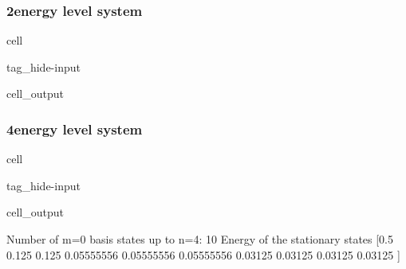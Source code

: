 \documentclass[letterpaper,10pt,english]{jupyterBook}
\begin{document}
\subsubsection{2\sphinxhyphen{}energy level system}
\label{\detokenize{ch/quantum-mechanics/history/matrix-mechanics/electron-perturbation-numerical:energy-level-system}}\label{\detokenize{ch/quantum-mechanics/history/matrix-mechanics/electron-perturbation-numerical:quantum-mechanics-electron-perturbation-numerical-simulation-2-energy-level}}
\begin{sphinxuseclass}{cell}
\begin{sphinxuseclass}{tag_hide-input}\begin{sphinxVerbatimOutput}

\begin{sphinxuseclass}{cell_output}
\noindent{}

\end{sphinxuseclass}\end{sphinxVerbatimOutput}

\end{sphinxuseclass}
\end{sphinxuseclass}

\subsubsection{4\sphinxhyphen{}energy level system}
\label{\detokenize{ch/quantum-mechanics/history/matrix-mechanics/electron-perturbation-numerical:quantum-mechanics-electron-perturbation-numerical-simulation-4-energy-level}}\label{\detokenize{ch/quantum-mechanics/history/matrix-mechanics/electron-perturbation-numerical:id1}}
\begin{sphinxuseclass}{cell}
\begin{sphinxuseclass}{tag_hide-input}\begin{sphinxVerbatimOutput}

\begin{sphinxuseclass}{cell_output}
\begin{sphinxVerbatim}[commandchars=\\\{\}]
Number of m=0 basis states up to n=4: 10
Energy of the stationary states
[\PYGZhy{}0.5        \PYGZhy{}0.125      \PYGZhy{}0.125      \PYGZhy{}0.05555556 \PYGZhy{}0.05555556 \PYGZhy{}0.05555556
 \PYGZhy{}0.03125    \PYGZhy{}0.03125    \PYGZhy{}0.03125    \PYGZhy{}0.03125   ]
\end{sphinxVerbatim}

\noindent{}

\end{sphinxuseclass}\end{sphinxVerbatimOutput}

\end{sphinxuseclass}
\end{sphinxuseclass}
\end{document}
